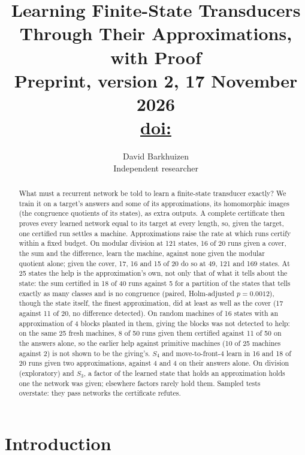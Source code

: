 \documentclass[11pt]{article}
\title{Learning Finite-State Transducers Through Their Approximations, with Proof\\[0.5em]
\large Preprint, version 2, 17 November 2026\\[0.2em]
\ifx\paperdoi\empty\draftnote{the DOI}\else\href{https://doi.org/\paperdoi}{doi:\paperdoi}\fi}
\author{
  David Barkhuizen\\
  Independent researcher
}
\date{}
\newcommand{\pn}[2]{#2}
\begin{document}
\maketitle

\begin{abstract}
What must a recurrent network be told to learn a finite-state transducer exactly? We train it on a
target's answers and some of its approximations, its homomorphic images (the congruence quotients of
its states), as extra outputs. A complete certificate then proves every learned network equal to its
target at every length, so, given the target, one certified run settles a machine. Approximations
raise the rate at which runs certify within a fixed budget. On modular division at 121 states, \pn{k4.cover}{16} of
20 runs given a cover, the sum and the difference, learn the machine, against \pn{k4.quotient}{none}
given the modular quotient alone; given the cover, \pn{k6.rates}{17, 16 and 15} of 20 do so at 49, 121 and 169
states. At 25 states the help is the approximation's own, not only that of what it tells about the
state: the sum certified in \pn{told1.d5-sum}{18} of 40 runs against \pn{told1.d5-matched}{5} for a
partition of the states that tells exactly as many classes and is no congruence (paired, Holm-adjusted
$p = \pn{told1.congruence-holm}{0.0012}$), though the state itself, the finest approximation, did
at least as well as the cover (\pn{t12.state}{17} against \pn{t12.cover}{11} of 20, no difference
detected). On random machines of 16 states with an approximation of 4 blocks planted in them, giving
the blocks was not detected to help: on the same \pn{told1.machines}{25} fresh machines,
\pn{told1.planted-runs}{8} of 50 runs given them certified against \pn{told1.alone-runs}{11} of 50
on the answers alone, so the earlier help against primitive machines (\pn{t10r.p2-machines}{10} of
25 machines against \pn{t10r.p0-machines}{2}) is not shown to be the giving's. $S_4$ and
move-to-front-4 learn in \pn{t11.s4}{16} and \pn{t11.mtf4}{18} of 20 runs given two
approximations, against \pn{t11.s4-alone}{4} and \pn{t11.mtf4-alone}{4} on their answers alone. On division (exploratory) and $S_3$, a factor of the learned state that holds an approximation
holds one the network was given; elsewhere factors rarely hold them. Sampled tests overstate: they pass networks the certificate refutes.
\end{abstract}

\section{Introduction}
\label{sec:intro}
\end{document}
